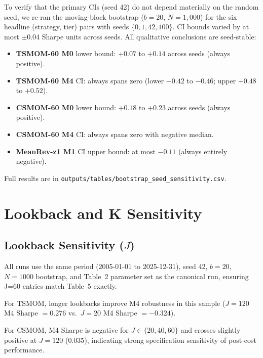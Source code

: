 \documentclass[12pt]{article}
\begin{document}
To verify that the primary CIs (seed 42) do not depend materially on the
random seed, we re-ran the moving-block bootstrap ($b = 20$, $N = 1{,}000$)
for the six headline (strategy, tier) pairs with seeds $\{0, 1, 42, 100\}$.
CI bounds varied by at most $\pm 0.04$ Sharpe units across seeds.
All qualitative conclusions are seed-stable:
\begin{itemize}[nosep]
  \item \textbf{TSMOM-60 M0} lower bound: $+0.07$ to $+0.14$
    across seeds (always positive).
  \item \textbf{TSMOM-60 M4} CI: always spans zero
    (lower $-0.42$ to $-0.46$; upper $+0.48$ to $+0.52$).
  \item \textbf{CSMOM-60 M0} lower bound: $+0.18$ to $+0.23$
    across seeds (always positive).
  \item \textbf{CSMOM-60 M4} CI: always spans zero with negative median.
  \item \textbf{MeanRev-z1 M1} CI upper bound: at most $-0.11$
    (always entirely negative).
\end{itemize}
Full results are in
\texttt{outputs/tables/bootstrap\_seed\_sensitivity.csv}.

\section{Lookback and K Sensitivity}
\label{app:lookback_k_sensitivity}

\subsection{Lookback Sensitivity ($J$)}

\begin{table}[H]
\centering
\caption{Lookback-window sensitivity for TSMOM and CSMOM under
M0 (na\"{i}ve) and M4 (+impact), full sample 2005--2025. Point
estimates only (no bootstrap CIs).}
\label{tab:lookback_sensitivity}
\small

\begin{tablenotes}\small
\item All runs use the same period (2005-01-01 to 2025-12-31), seed 42,
  $b=20$, $N=1000$ bootstrap, and Table~2 parameter set as the canonical
  run, ensuring J=60 entries match Table~5 exactly.
\item For TSMOM, longer lookbacks improve M4 robustness in this sample
($J=120$ M4 Sharpe $= 0.276$ vs.\ $J=20$ M4 Sharpe $= -0.324$).
\item For CSMOM, M4 Sharpe is negative for $J \in \{20,40,60\}$ and
crosses slightly positive at $J=120$ ($0.035$), indicating strong
specification sensitivity of post-cost performance.
\end{tablenotes}
\end{table}
\end{document}

